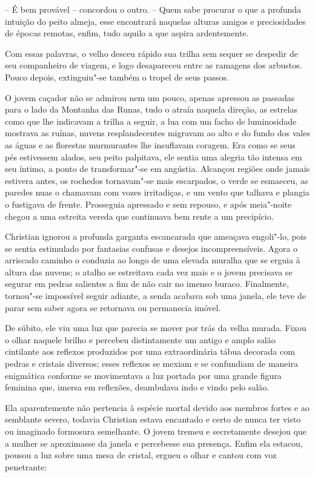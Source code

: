 -- É bem provável -- concordou o outro. -- Quem sabe procurar o que a
profunda intuição do peito almeja, esse encontrará naquelas alturas
amigos e preciosidades de épocas remotas, enfim, tudo aquilo a que
aspira ardentemente.

Com essas palavras, o velho desceu rápido sua trilha sem sequer se despedir 
de seu companheiro de viagem, e logo desapareceu entre as
ramagens dos arbustos. Pouco depois, extinguiu"-se também o tropel de
seus passos.

O jovem caçador não se admirou nem um pouco, apenas apressou as passadas para o
lado da Montanha das Runas, tudo o atraía naquela direção, as estrelas
como que lhe indicavam a trilha a seguir, a lua com um facho de
luminosidade mostrava as ruínas, nuvens resplandecentes migravam ao alto e do
fundo dos vales as águas e as florestas murmurantes lhe insuflavam
coragem. Era como se seus pés estivessem alados, seu peito palpitava,
ele sentia uma alegria tão intensa em seu íntimo, a ponto de
transformar"-se em angústia. Alcançou regiões onde jamais estivera
antes, os rochedos tornavam"-se mais escarpados, o verde se esmaeceu, as
paredes nuas o chamavam com vozes irritadiças, e um vento que talhava e
plangia o fustigava de frente. Prosseguia apressado e sem repouso, e
após meia"-noite chegou a uma estreita vereda que continuava bem rente a
um precipício.

Christian ignorou a profunda garganta escancarada que ameaçava
engoli"-lo, pois se sentia estimulado por fantasias confusas e desejos
incompreensíveis. Agora o arriscado caminho o conduzia ao longo de uma
elevada muralha que se erguia à altura das nuvens; o atalho se
estreitava cada vez mais e o jovem precisava se segurar em pedras
salientes a fim de não cair no imenso buraco. Finalmente, tornou"-se
impossível seguir adiante, a senda acabava sob uma janela, ele teve de
parar sem saber agora se retornava ou permanecia imóvel.

De súbito, ele viu uma luz que parecia se mover por trás da velha
murada. Fixou o olhar naquele brilho e percebeu distintamente um antigo
e amplo salão cintilante aos reflexos produzidos por uma extraordinária
tábua decorada com pedras e cristais diversos; esses reflexos se mexiam
e se confundiam de maneira enigmática conforme se movimentava a luz
portada por uma grande figura feminina que, imersa em reflexões,
deambulava indo e vindo pelo salão.

Ela aparentemente não pertencia à espécie mortal devido aos membros
fortes e ao semblante severo, todavia Christian estava encantado e
certo de nunca ter visto ou imaginado formosura semelhante. O jovem
tremeu e secretamente desejou que a mulher se aproximasse da janela e
percebesse sua presença. Enfim ela estacou, pousou a luz sobre uma mesa
de cristal, ergueu o olhar e cantou com voz penetrante:

